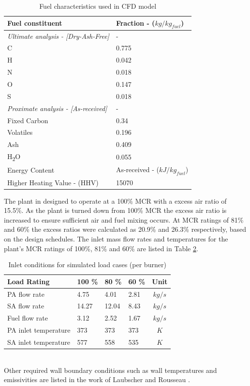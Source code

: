 \documentclass{webofc}
\begin{document}
\begin{table}[h!]
\centering
\caption{Fuel characteristics used in CFD model} \label{tab_fuel}
\begin{tabular}{ll}
\hline
Fuel constituent & Fraction - ($kg/kg_{fuel}$)   \\
\hline
\textit{Ultimate analysis - [Dry-Ash-Free]} & -  \\
C & 0.775 \\
H & 0.042 \\
N & 0.018 \\
O & 0.147 \\
S & 0.018 \\
\textit{Proximate analysis - [As-received]} & -\\
Fixed Carbon & 0.34\\
Volatiles & 0.196\\
Ash & 0.409\\
H\textsubscript{2}O & 0.055\\
\hline
Energy Content & As-received - ($kJ/kg_{fuel}$)\\
\hline
Higher Heating Value - (HHV) & 15070 \\
\hline
\end{tabular}
\end{table}

The plant in designed to operate at a 100\% MCR with a excess air ratio of 15.5\%. As the plant is turned down from 100\% MCR the excess air ratio is increased to ensure sufficient air and fuel mixing occurs. At MCR ratings of 81\% and 60\% the excess ratios were calculated as 20.9\% and 26.3\% respectively, based on the design schedules. The inlet mass flow rates and temperatures for the plant's MCR ratings of 100\%, 81\% and 60\% are listed in Table \ref{tab_inlets}.
\begin{table}[h!]
\centering
\caption{Inlet conditions for simulated load cases (per burner)}\label{tab_inlets}       
\begin{tabular}{llllc}
\hline
Load Rating & 100 \% & 80 \% & 60 \% & Unit  \\
\hline
PA flow rate & 4.75 & 4.01 & 2.81 & $kg/s$   \\
SA flow rate & 14.27 & 12.04 & 8.43 & $kg/s$ \\
Fuel flow rate & 3.12 & 2.52 & 1.67 & $kg/s$ \\
PA inlet temperature & 373 & 373 & 373 & $K$ \\
SA inlet temperature & 577 &558 & 535 & $K$  \\
\hline
\end{tabular}
\end{table}\\
Other required wall boundary conditions such as wall temperatures and emissivities are listed in the work of Laubscher and Rousseau \cite{laubscher_1}.
\end{document}
